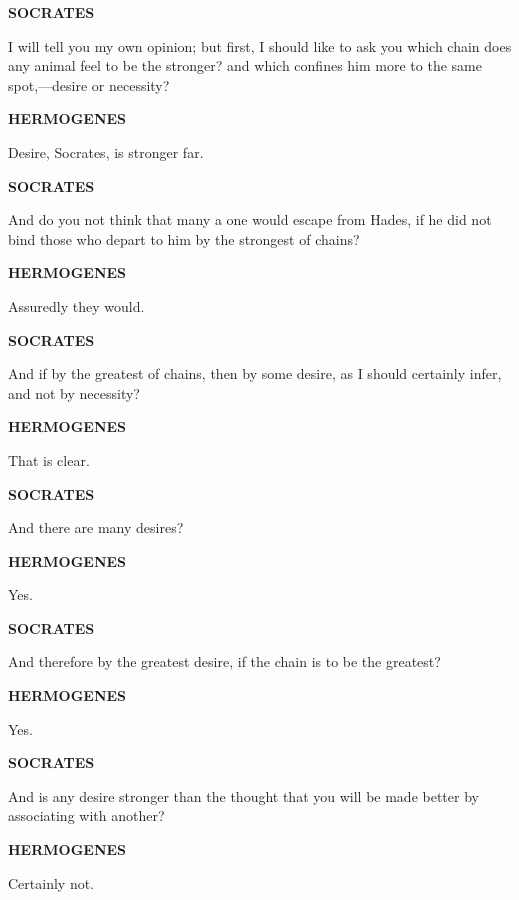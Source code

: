 \documentclass[11pt,letter]{article}
\begin{document}
\par \textbf{SOCRATES}
\par   I will tell you my own opinion; but first, I should like to ask you which chain does any animal feel to be the stronger? and which confines him more to the same spot,—desire or necessity?

\par \textbf{HERMOGENES}
\par   Desire, Socrates, is stronger far.

\par \textbf{SOCRATES}
\par   And do you not think that many a one would escape from Hades, if he did not bind those who depart to him by the strongest of chains?

\par \textbf{HERMOGENES}
\par   Assuredly they would.

\par \textbf{SOCRATES}
\par   And if by the greatest of chains, then by some desire, as I should certainly infer, and not by necessity?

\par \textbf{HERMOGENES}
\par   That is clear.

\par \textbf{SOCRATES}
\par   And there are many desires?

\par \textbf{HERMOGENES}
\par   Yes.

\par \textbf{SOCRATES}
\par   And therefore by the greatest desire, if the chain is to be the greatest?

\par \textbf{HERMOGENES}
\par   Yes.

\par \textbf{SOCRATES}
\par   And is any desire stronger than the thought that you will be made better by associating with another?

\par \textbf{HERMOGENES}
\par   Certainly not.
\end{document}

